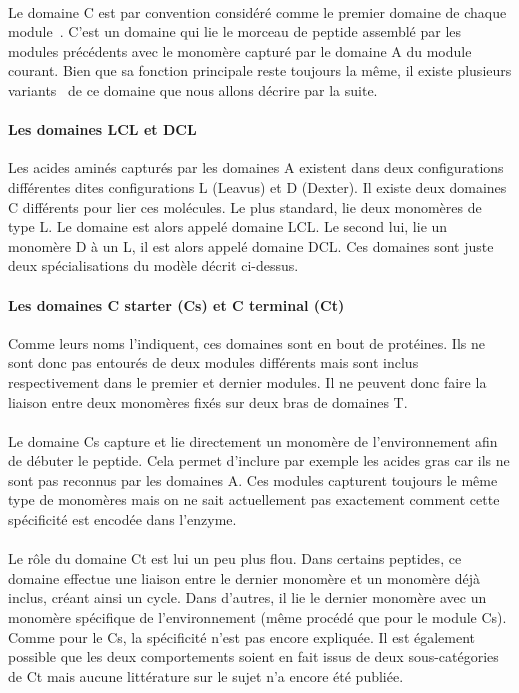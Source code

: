 \documentclass[12pt,french,twoside]{report}
\begin{document}
\paragraph{}Le domaine C est par convention considéré comme le premier domaine de chaque module~\cite{stachelhaus_peptide_1998}.
C'est un domaine qui lie le morceau de peptide assemblé par les modules précédents avec le monomère capturé par le domaine A du module courant.
Bien que sa fonction principale reste toujours la même, il existe plusieurs variants~\cite{rausch_phylogenetic_2007} de ce domaine que nous allons décrire par la suite.

\paragraph{Les domaines LCL et DCL}
Les acides aminés capturés par les domaines A existent dans deux configurations différentes dites configurations L (Leavus) et D (Dexter).
Il existe deux domaines C différents pour lier ces molécules.
Le plus standard, lie deux monomères de type L. Le domaine est alors appelé domaine LCL.
Le second lui, lie un monomère D à un L, il est alors appelé domaine DCL.
Ces domaines sont juste deux spécialisations du modèle décrit ci-dessus.

\paragraph{Les domaines C starter (Cs) et C terminal (Ct)}
Comme leurs noms l'indiquent, ces domaines sont en bout de protéines.
Ils ne sont donc pas entourés de deux modules différents mais sont inclus respectivement dans le premier et dernier modules.
Il ne peuvent donc faire la liaison entre deux monomères fixés sur deux bras de domaines T.

\paragraph{}Le domaine Cs capture et lie directement un monomère de l'environnement afin de débuter le peptide.
Cela permet d'inclure par exemple les acides gras car ils ne sont pas reconnus par les domaines A.
Ces modules capturent toujours le même type de monomères mais on ne sait actuellement pas exactement comment cette spécificité est encodée dans l'enzyme.

\paragraph{}Le rôle du domaine Ct est lui un peu plus flou.
Dans certains peptides, ce domaine effectue une liaison entre le dernier monomère et un monomère déjà inclus, créant ainsi un cycle\cite{gao_cyclization_2012}.
Dans d'autres, il lie le dernier monomère avec un monomère spécifique de l'environnement (même procédé que pour le module Cs).
Comme pour le Cs, la spécificité n'est pas encore expliquée.
Il est également possible que les deux comportements soient en fait issus de deux sous-catégories de Ct mais aucune littérature sur le sujet n'a encore été publiée.
\end{document}
